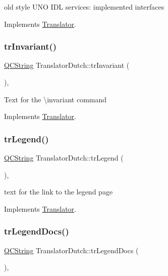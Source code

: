 old style U\+NO I\+DL services\+: implemented interfaces 

Implements \mbox{\hyperlink{class_translator}{Translator}}.

\mbox{\label{class_translator_dutch_aaef534a27430bfbcddd70c08967be07a}} 
\subsubsection{\texorpdfstring{trInvariant()}{trInvariant()}}
{\footnotesize\ttfamily \mbox{\hyperlink{class_q_c_string}{Q\+C\+String}} Translator\+Dutch\+::tr\+Invariant (\begin{DoxyParamCaption}{ }\end{DoxyParamCaption})\hspace{0.3cm}{\ttfamily [inline]}, {\ttfamily [virtual]}}

Text for the \textbackslash{}invariant command 

Implements \mbox{\hyperlink{class_translator}{Translator}}.

\mbox{\label{class_translator_dutch_a3767a87324b1f75b42cf70072625cb55}} 
\subsubsection{\texorpdfstring{trLegend()}{trLegend()}}
{\footnotesize\ttfamily \mbox{\hyperlink{class_q_c_string}{Q\+C\+String}} Translator\+Dutch\+::tr\+Legend (\begin{DoxyParamCaption}{ }\end{DoxyParamCaption})\hspace{0.3cm}{\ttfamily [inline]}, {\ttfamily [virtual]}}

text for the link to the legend page 

Implements \mbox{\hyperlink{class_translator}{Translator}}.

\mbox{\label{class_translator_dutch_a7e0e4b56a867fa4af556b2bb8677a62d}} 
\subsubsection{\texorpdfstring{trLegendDocs()}{trLegendDocs()}}
{\footnotesize\ttfamily \mbox{\hyperlink{class_q_c_string}{Q\+C\+String}} Translator\+Dutch\+::tr\+Legend\+Docs (\begin{DoxyParamCaption}{ }\end{DoxyParamCaption})\hspace{0.3cm}{\ttfamily [inline]}, {\ttfamily [virtual]}}

